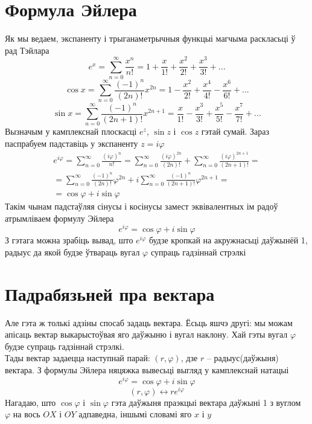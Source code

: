 \documentclass{article}
\newcommand{\rl}{\hspace*{5mm}}
\renewcommand{\phi}{\varphi}
\begin{document}
\section{Формула Эйлера}
\rl Як мы ведаем, экспаненту і трыганаметрычныя функцыі магчыма раскласьці ў рад Тэйлара
\[ e^x = \sum_{n = 0}^{\infty}{\frac{x^n}{n!}} = 1 + \frac{x}{1!} + \frac{x^2}{2!} + \frac{x^3}{3!} + ...\]
\[ \cos{x} = \sum_{n = 0}^{\infty}{\frac{(-1)^n}{(2n)!}}x^{2n} = 1 - \frac{x^2}{2!} + \frac{x^4}{4!} - \frac{x^6}{6!} + ...\]
\[ \sin{x} = \sum_{n = 0}^{\infty}{\frac{(-1)^{n}}{(2n + 1)!}x^{2n + 1}} = \frac{x}{1!} - \frac{x^3}{3!} + \frac{x^5}{5!} - \frac{x^7}{7!} + ... \]
\rl Вызначым у камплекснай плоскасці $e^{z}$, $\sin{z}$ і $\cos{z}$ гэтай сумай. Зараз паспрабуем падставіць у экспаненту $z = i\phi$
\begin{align*}
    e^{i\phi} = \sum_{n = 0}^{\infty}{\frac{(i\phi)^n}{n!}} = \sum_{n = 0}^{\infty}{\frac{(i\phi)^{2n}}{(2n)!}} + \sum_{n = 0}^{\infty}{\frac{(i\phi)^{2n + 1}}{(2n + 1)!}} = \\
    = \sum_{n = 0}^{\infty}{\frac{(-1)^{n}}{(2n)!}\phi^{2n}} + i\sum_{n = 0}^{\infty}{\frac{(-1)^{n}}{(2n + 1)!}\phi^{2n + 1}} = \\
    = \cos{\phi} + i \sin{\phi}
\end{align*}
\rl Такім чынам падстаўляя сінусы і косінусы замест эквівалентных ім радоў атрымліваем формулу Эйлера
\[ e^{i\phi} = \cos{\phi} + i\sin{\phi} \]
\rl З гэтага можна зрабіць вывад, што $e^{i\phi}$ будзе кропкай на акружнасьці даўжынёй 1, радыус да якой будзе ўтвараць вугал $\phi$ супраць гадзіннай стрэлкі
\section{Падрабязьней пра вектара}
\rl Але гэта ж толькі адзіны спосаб задаць вектара. Ёсьць яшчэ другі: мы можам апісаць вектар выкарыстоўвая яго даўжыню і вугал наклону.
Хай гэты вугал $\phi$ будзе супраць гадзіннай стрэлкі. \\
\rl Тады вектар задаецца наступнай парай: $(r, \phi)$, дзе $r$ \--- радыус(даўжыня) вектара.
З формулы Эйлера няцяжка вывесьці выгляд у камплекснай натацыі
\[ e^{i\phi} = \cos{\phi} + i\sin{\phi} \]
\[ (r, \phi) \leftrightarrow re^{i\phi} \]
\rl Нагадаю, што $\cos{\phi}$ і $\sin{\phi}$ гэта даўжыня праэкцыі вектара даўжыні 1 з вуглом $\phi$ на вось $OX$ і $OY$ адпаведна, іншымі словамі яго $x$ і $y$
\end{document}
